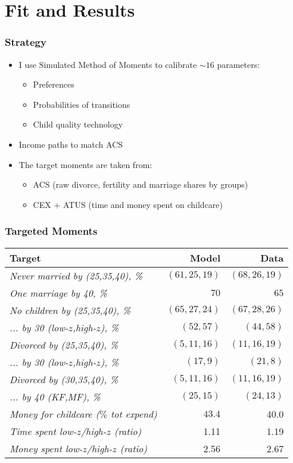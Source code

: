 \documentclass{beamer}
\begin{document}
\section{Fit and Results}
\begin{frame}
\frametitle{Strategy}
\begin{itemize}
\item I use Simulated Method of Moments to calibrate $\sim 16$ parameters:
\begin{itemize}
\item Preferences
\item Probabilities of transitions
\item Child quality technology
\end{itemize}
\item Income paths to match ACS
\item The target moments are taken from:
\begin{itemize}
\item ACS (raw divorce, fertility and marriage shares by groups)
\item CEX + ATUS (time and money spent on childcare)
\end{itemize}
\end{itemize}
\end{frame}

\begin{frame}
\frametitle{Targeted Moments}
\begin{tabular}{ l r r}\hline
Target & Model & Data \\\hline
\footnotesize\textit{Never married by (25,35,40), \% }& $(61,25,19)$ &  $(68,26,19)$ \\
\footnotesize \textit{One marriage by 40, \%}  & $70$ & $65$ \\\hline
\footnotesize \textit{No children by (25,35,40), \%}  & $(65,27,24)$ & $(67,28,26)$ \\
\footnotesize \textit{... by 30 (low-$z$,high-$z$), \%}  & $(52,57)$ & $(44,58)$ \\\hline
\footnotesize \textit{Divorced by (25,35,40), \%}  & $(5,11,16)$ & $(11,16,19)$ \\
\footnotesize \textit{... by 30 (low-$z$,high-$z$), \%}  & $(17,9)$ & $(21,8)$ \\\hline
\footnotesize \textit{Divorced by (30,35,40), \%}  & $(5,11,16)$ & $(11,16,19)$ \\
\footnotesize \textit{... by 40 (KF,MF), \%}  & $(25,15)$ & $(24,13)$ \\\hline
\footnotesize \textit{Money for childcare ($\%$ tot expend)} & $43.4$ & 40.0 \\
\footnotesize \textit{Time spent low-$z$/high-$z$ (ratio)} & 1.11 & 1.19 \\
\footnotesize \textit{Money spent low-$z$/high-$z$ (ratio)} & 2.56  & 2.67 \\\hline

\end{tabular}
\end{frame}
\end{document}
